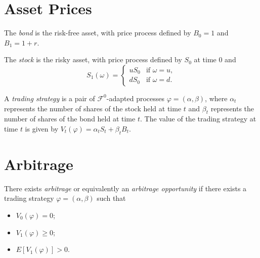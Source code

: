 \section{Asset Prices}

\begin{definition}\label{def:bond}
    \leanok
    The \emph{bond} is the risk-free asset, with price process defined by $B_0 = 1$ and $B_1 = 1 + r$.
\end{definition}

\begin{definition}\label{def:stock}
    \leanok
    The \emph{stock} is the risky asset, with price process defined by $S_0$ at time 0 and
    \[
        S_1(\omega) = 
        \begin{cases}
            u S_0 & \text{if } \omega = u, \\
            d S_0 & \text{if } \omega = d.
        \end{cases}    
    \]
\end{definition}

\begin{definition}\label{def:trading_strategy}
    \leanok
    A \emph{trading strategy} is a pair of $\mathcal{F}^0$-adapted processes $\varphi = (\alpha, \beta)$, 
    where $\alpha_t$ represents the number of shares of the stock held at time $t$ and $\beta_t$ represents the number of shares of the bond held at time $t$.
    The value of the trading strategy at time $t$ is given by $V_t(\varphi) = \alpha_t S_t + \beta_t B_t$.
\end{definition}

\section{Arbitrage}

\begin{definition}\label{def:arbitrage}
    \leanok
    There exists \emph{arbitrage} or equivalently an \emph{arbitrage opportunity} if there exists a trading strategy $\varphi = (\alpha, \beta)$ such that
    \begin{itemize}
        \item $V_0(\varphi) = 0$;
        \item $V_1(\varphi) \geq 0$;
        \item $E[V_1(\varphi)] > 0$.
    \end{itemize}
\end{definition}

